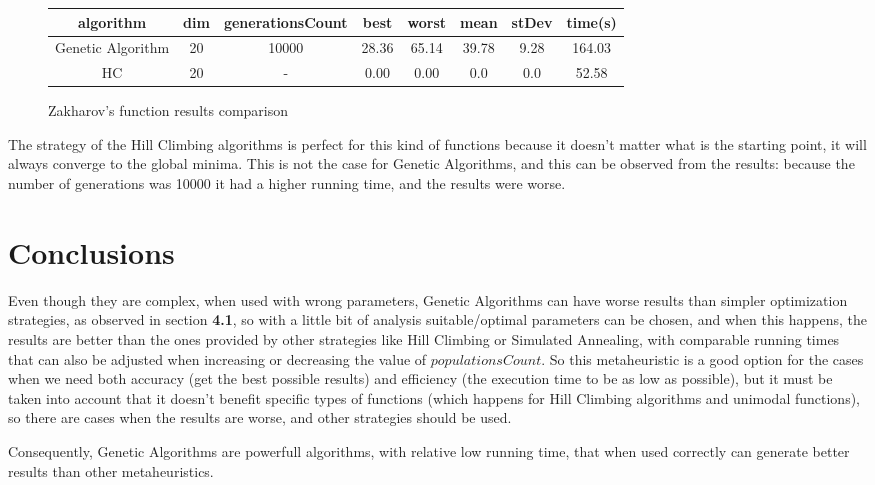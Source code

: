 \documentclass[a4paper]{article}
\begin{document}
\begin{itemize}
		\begin{figure}[!h]
			\centering
			\begin{tabular}{||c |  c | c | c | c | c | c | c ||}
				\hline
				algorithm & dim & generationsCount & best & worst & mean & stDev & time(s) \\ \hline \hline
				Genetic Algorithm & 20 & 10000 & 28.36 & 65.14 & 39.78 & 9.28 & 164.03 \\ \hline
				HC & 20 & - & 0.00 & 0.00 & 0.0 & 0.0 & 52.58 \\ \hline
			\end{tabular}
			\caption{Zakharov’s function results comparison}
		\end{figure}
	
		The strategy of the Hill Climbing algorithms is perfect for this kind of functions because it doesn't matter what is the starting point, it will always converge to the global minima. This is not the case for Genetic Algorithms, and this can be observed from the results: because the number of generations was 10000 it had a higher running time, and the results were worse.
	
	\end{itemize}
	
	\section{Conclusions}
	
	Even though they are complex, when used with wrong parameters, Genetic Algorithms can have worse results than simpler optimization strategies, as observed in section \textbf{4.1}, so with a little bit of analysis suitable/optimal parameters can be chosen, and when this happens, the results are better than the ones provided by other strategies like Hill Climbing or Simulated Annealing, with comparable running times that can also be adjusted when increasing or decreasing the value of $populationsCount$. So this metaheuristic is a good option for the cases when we need both accuracy (get the best possible results) and efficiency (the execution time to be as low as possible), but it must be taken into account that it doesn't benefit specific types of functions (which happens for Hill Climbing algorithms and unimodal functions), so there are cases when the results are worse, and other strategies should be used. 
	
	Consequently, Genetic Algorithms are powerfull algorithms, with relative low running time, that when used correctly can generate better results than other metaheuristics.
	
\end{document}
